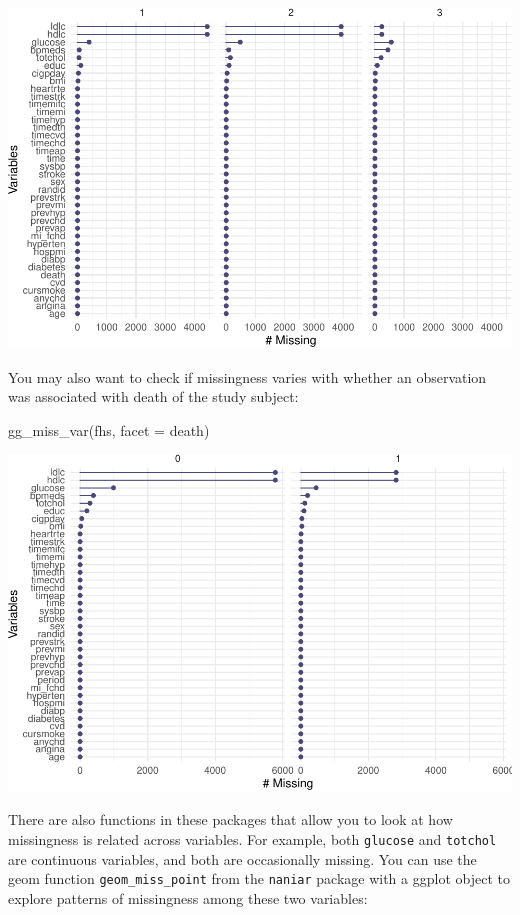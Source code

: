 \documentclass[
]{book}
\newenvironment{Shaded}{\begin{snugshade}}{\end{snugshade}}
\newcommand{\AttributeTok}[1]{\textcolor[rgb]{0.77,0.63,0.00}{#1}}
\newcommand{\FunctionTok}[1]{\textcolor[rgb]{0.00,0.00,0.00}{#1}}
\newcommand{\NormalTok}[1]{#1}
\begin{document}
\includegraphics{adv_epi_analysis_files/figure-latex/unnamed-chunk-175-1.pdf}

You may also want to check if missingness varies with whether an observation
was associated with death of the study subject:

\begin{Shaded}
\begin{Highlighting}[]
\FunctionTok{gg\_miss\_var}\NormalTok{(fhs, }\AttributeTok{facet =}\NormalTok{ death)}
\end{Highlighting}
\end{Shaded}

\includegraphics{adv_epi_analysis_files/figure-latex/unnamed-chunk-176-1.pdf}

There are also functions in these packages that allow you to look at how
missingness is related across variables. For example, both \texttt{glucose} and
\texttt{totchol} are continuous variables, and both are occasionally missing. You
can use the geom function \texttt{geom\_miss\_point} from the \texttt{naniar} package
with a ggplot object to explore patterns of missingness among these two
variables:
\end{document}
